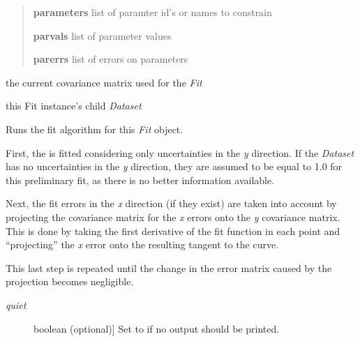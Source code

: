 \documentclass[a4paper,10pt,english]{sphinxmanual}
\begin{document}
\begin{fulllineitems}
\begin{fulllineitems}
\begin{quote}
\textbf{parameters} list of paramter id's or names to constrain

\textbf{parvals}    list of parameter values

\textbf{parerrs}    list of errors on parameters
\end{quote}

\end{fulllineitems}


\begin{fulllineitems}
\label{index:kafe.fit.Fit.current_cov_mat}
the current covariance matrix used for the \emph{Fit}

\end{fulllineitems}


\begin{fulllineitems}
\label{index:kafe.fit.Fit.dataset}
this Fit instance's child \emph{Dataset}

\end{fulllineitems}


\begin{fulllineitems}
\label{index:kafe.fit.Fit.do_fit}
Runs the fit algorithm for this \emph{Fit} object.

First, the  is fitted considering only uncertainties in the
\emph{y} direction. If the \emph{Dataset} has no uncertainties in the \emph{y}
direction, they are assumed to be equal to 1.0 for this preliminary
fit, as there is no better information available.

Next, the fit errors in the \emph{x} direction (if they exist) are taken
into account by projecting the covariance matrix for the \emph{x} errors
onto the \emph{y} covariance matrix. This is done by taking the first
derivative of the fit function in each point and ``projecting'' the \emph{x}
error onto the resulting tangent to the curve.

This last step is repeated until the change in the error matrix caused
by the projection becomes negligible.
\begin{description}
\item[{\emph{quiet}}] \leavevmode{[}boolean (optional){]}
Set to  if no output should be printed.


\end{description}
\end{fulllineitems}
\end{fulllineitems}
\end{document}
